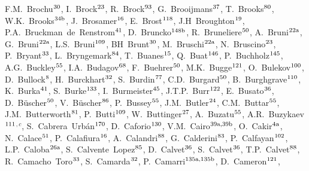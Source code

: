 \begin{flushleft}
F.M.~Brochu$^\textrm{\scriptsize 30}$,
I.~Brock$^\textrm{\scriptsize 23}$,
R.~Brock$^\textrm{\scriptsize 93}$,
G.~Brooijmans$^\textrm{\scriptsize 37}$,
T.~Brooks$^\textrm{\scriptsize 80}$,
W.K.~Brooks$^\textrm{\scriptsize 34b}$,
J.~Brosamer$^\textrm{\scriptsize 16}$,
E.~Brost$^\textrm{\scriptsize 118}$,
J.H~Broughton$^\textrm{\scriptsize 19}$,
P.A.~Bruckman~de~Renstrom$^\textrm{\scriptsize 41}$,
D.~Bruncko$^\textrm{\scriptsize 148b}$,
R.~Bruneliere$^\textrm{\scriptsize 50}$,
A.~Bruni$^\textrm{\scriptsize 22a}$,
G.~Bruni$^\textrm{\scriptsize 22a}$,
L.S.~Bruni$^\textrm{\scriptsize 109}$,
BH~Brunt$^\textrm{\scriptsize 30}$,
M.~Bruschi$^\textrm{\scriptsize 22a}$,
N.~Bruscino$^\textrm{\scriptsize 23}$,
P.~Bryant$^\textrm{\scriptsize 33}$,
L.~Bryngemark$^\textrm{\scriptsize 84}$,
T.~Buanes$^\textrm{\scriptsize 15}$,
Q.~Buat$^\textrm{\scriptsize 146}$,
P.~Buchholz$^\textrm{\scriptsize 145}$,
A.G.~Buckley$^\textrm{\scriptsize 55}$,
I.A.~Budagov$^\textrm{\scriptsize 68}$,
F.~Buehrer$^\textrm{\scriptsize 50}$,
M.K.~Bugge$^\textrm{\scriptsize 121}$,
O.~Bulekov$^\textrm{\scriptsize 100}$,
D.~Bullock$^\textrm{\scriptsize 8}$,
H.~Burckhart$^\textrm{\scriptsize 32}$,
S.~Burdin$^\textrm{\scriptsize 77}$,
C.D.~Burgard$^\textrm{\scriptsize 50}$,
B.~Burghgrave$^\textrm{\scriptsize 110}$,
K.~Burka$^\textrm{\scriptsize 41}$,
S.~Burke$^\textrm{\scriptsize 133}$,
I.~Burmeister$^\textrm{\scriptsize 45}$,
J.T.P.~Burr$^\textrm{\scriptsize 122}$,
E.~Busato$^\textrm{\scriptsize 36}$,
D.~B\"uscher$^\textrm{\scriptsize 50}$,
V.~B\"uscher$^\textrm{\scriptsize 86}$,
P.~Bussey$^\textrm{\scriptsize 55}$,
J.M.~Butler$^\textrm{\scriptsize 24}$,
C.M.~Buttar$^\textrm{\scriptsize 55}$,
J.M.~Butterworth$^\textrm{\scriptsize 81}$,
P.~Butti$^\textrm{\scriptsize 109}$,
W.~Buttinger$^\textrm{\scriptsize 27}$,
A.~Buzatu$^\textrm{\scriptsize 55}$,
A.R.~Buzykaev$^\textrm{\scriptsize 111}$$^{,c}$,
S.~Cabrera~Urb\'an$^\textrm{\scriptsize 170}$,
D.~Caforio$^\textrm{\scriptsize 130}$,
V.M.~Cairo$^\textrm{\scriptsize 39a,39b}$,
O.~Cakir$^\textrm{\scriptsize 4a}$,
N.~Calace$^\textrm{\scriptsize 51}$,
P.~Calafiura$^\textrm{\scriptsize 16}$,
A.~Calandri$^\textrm{\scriptsize 88}$,
G.~Calderini$^\textrm{\scriptsize 83}$,
P.~Calfayan$^\textrm{\scriptsize 102}$,
L.P.~Caloba$^\textrm{\scriptsize 26a}$,
S.~Calvente~Lopez$^\textrm{\scriptsize 85}$,
D.~Calvet$^\textrm{\scriptsize 36}$,
S.~Calvet$^\textrm{\scriptsize 36}$,
T.P.~Calvet$^\textrm{\scriptsize 88}$,
R.~Camacho~Toro$^\textrm{\scriptsize 33}$,
S.~Camarda$^\textrm{\scriptsize 32}$,
P.~Camarri$^\textrm{\scriptsize 135a,135b}$,
D.~Cameron$^\textrm{\scriptsize 121}$,
$$
\end{flushleft}

